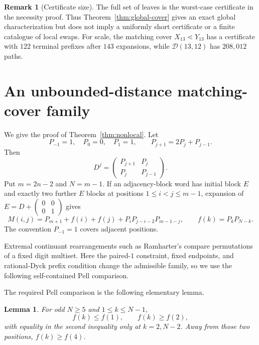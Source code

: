 \documentclass[11pt]{amsart}
\newtheorem{lemma}[theorem]{Lemma}
\theoremstyle{definition}
\newtheorem{remark}[theorem]{Remark}
\newcommand{\cD}{\mathcal D}
\begin{document}
\begin{remark}[Certificate size]\label{rem:scope}
The full set of leaves is the worst-case certificate in the necessity proof.
Thus Theorem~\ref{thm:global-cover} gives an exact global characterization but
does not imply a uniformly short certificate or a finite catalogue of local
swaps.  For scale,
the matching cover $X_{13}\lessdot Y_{13}$ has a certificate with $122$
terminal prefixes after $143$ expansions, while $\cD(13,12)$ has $208{,}012$
paths.
\end{remark}

\section{An unbounded-distance matching-cover family}\label{sec:nonlocal}

We give the proof of Theorem~\ref{thm:nonlocal}.  Let
\[
 P_{-1}=1,\quad P_0=0,\quad P_1=1,\qquad
 P_{j+1}=2P_j+P_{j-1}.
\]
Then
\[
 D^j=\begin{pmatrix}P_{j+1}&P_j\\P_j&P_{j-1}\end{pmatrix}.
\]
Put $m=2n-2$ and $N=m-1$.  If an adjacency-block word has initial block $E$
and exactly two further $E$ blocks at positions $1\leq i<j\leq m-1$, expansion
of $E=D+\left(\begin{smallmatrix}0&0\\0&1\end{smallmatrix}\right)$ gives
\begin{equation}\label{eq:three-E}
 M(i,j)=P_{m+1}+f(i)+f(j)+P_iP_{j-i-2}P_{m-1-j},
 \qquad f(k)=P_kP_{N-k}.
\end{equation}
The convention $P_{-1}=1$ covers adjacent positions.

Extremal continuant rearrangements such as Ramharter's
\cite{Ramharter} compare permutations of a fixed digit multiset.  Here the
paired-$1$ constraint, fixed endpoints, and rational-Dyck prefix condition
change the admissible family, so we use the following self-contained Pell
comparison.

The required Pell comparison is the following elementary lemma.

\begin{lemma}\label{lem:pell-extrema}
For odd $N\geq5$ and $1\leq k\leq N-1$,
\[
 f(k)\leq f(1),\qquad
 f(k)\geq f(2),
\]
with equality in the second inequality only at $k=2,N-2$.  Away from those
two positions, $f(k)\geq f(4)$.
\end{lemma}
\end{document}
